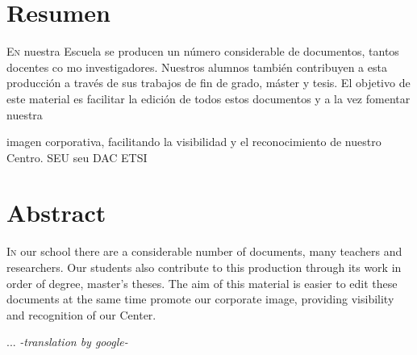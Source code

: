 \chapter*{Resumen}
\pagestyle{especial}
{}

\lettrine[lraise=-0.1, lines=2, loversize=0.2]{E}{n} nuestra 
Escuela se producen un número considerable de documentos,
tantos docentes co
mo investigadores. Nuestros alumnos también contribuyen a esta producción a través de sus trabajos de
fin de grado, 
máster y tesis. El objetivo de este material es facilitar la edición de todos estos documentos y a la vez
fomentar nuestra 

imagen 
corporativa, facilitando la visibilidad y el reconocimiento de nuestro Centro. \gls{SEU} seu DAC
\gls{ETSI}



\chapter*{Abstract}
\pagestyle{especial}
{}

\lettrine[lraise=-0.1, lines=2, loversize=0.2]{I}{n} our school there are a considerable number of documents, many teachers and researchers. Our students also contribute to this production through its work in order of degree, master's theses. The aim of this material is easier to edit these documents at the same time promote our corporate image, providing visibility and recognition of our Center. 

...
\emph{-translation by google-}


